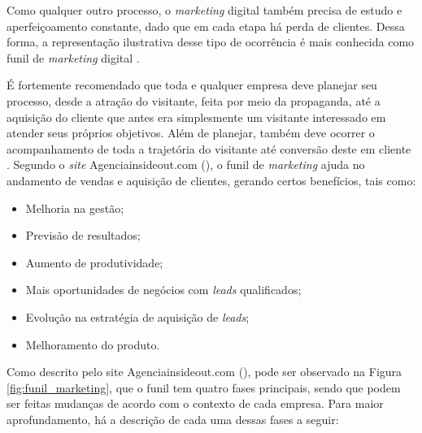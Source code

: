Como qualquer outro processo, o \textit{marketing} digital também precisa de estudo e aperfeiçoamento constante, dado que em cada etapa há perda de clientes. Dessa forma, a representação ilustrativa desse tipo de ocorrência é mais conhecida como funil de \textit{marketing} digital \cite{BORGES:2017}.

É fortemente recomendado que toda e qualquer empresa deve planejar seu processo, desde a atração do visitante, feita por meio da propaganda, até a aquisição do cliente que antes era simplesmente um visitante interessado em atender seus próprios objetivos. Além de planejar, também deve ocorrer o acompanhamento de toda a trajetória do visitante até conversão deste em cliente \cite{INSIDEOUT:2018}.
Segundo o \textit{site} Agenciainsideout.com (\citeyear{INSIDEOUT:2018}), o funil de \textit{marketing} ajuda no andamento de vendas e aquisição de clientes, gerando certos benefícios, tais como:

\begin{itemize}
    \item Melhoria na gestão;
    
    \item Previsão de resultados;
    
    \item Aumento de produtividade;
    
    \item Mais oportunidades de negócios com \textit{leads} qualificados;
    
    \item Evolução na estratégia de aquisição de \textit{leads};
    
    \item Melhoramento do produto.

\end{itemize}

Como descrito pelo site Agenciainsideout.com (\citeyear{INSIDEOUT:2018}), pode ser observado na Figura \ref{fig:funil_marketing}, que o funil tem quatro fases principais, sendo que podem ser feitas mudanças de acordo com o contexto de cada empresa. Para maior aprofundamento, há a descrição de cada uma dessas fases a seguir:

